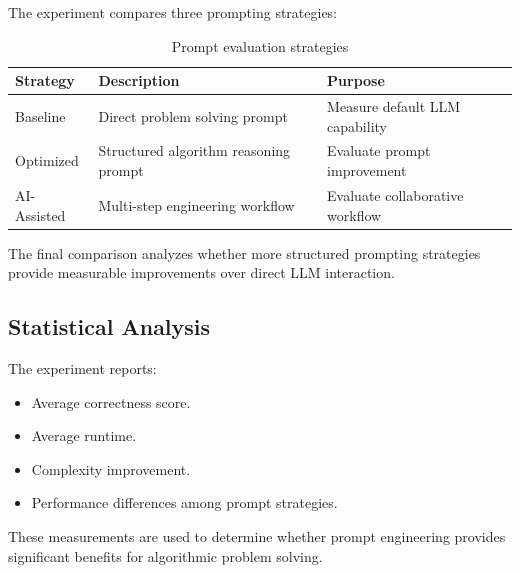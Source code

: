 The experiment compares three prompting strategies:


\begin{table}[h]

\centering

\begin{tabular}{lll}

\toprule

Strategy & Description & Purpose \\

\midrule

Baseline & Direct problem solving prompt & Measure default LLM capability \\

Optimized & Structured algorithm reasoning prompt & Evaluate prompt improvement \\

AI-Assisted & Multi-step engineering workflow & Evaluate collaborative workflow \\

\bottomrule

\end{tabular}


\caption{Prompt evaluation strategies}

\end{table}



The final comparison analyzes whether more structured prompting strategies
provide measurable improvements over direct LLM interaction.



\subsection{Statistical Analysis}


The experiment reports:

\begin{itemize}

\item Average correctness score.

\item Average runtime.

\item Complexity improvement.

\item Performance differences among prompt strategies.

\end{itemize}


These measurements are used to determine whether prompt engineering provides
significant benefits for algorithmic problem solving.
